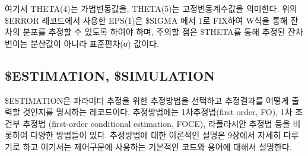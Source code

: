 \documentclass[
  10pt,
  krantz2,
  a4paper]{krantz}
\newenvironment{Shaded}{\begin{snugshade}}{\end{snugshade}}
\newcommand{\DecValTok}[1]{\textcolor[rgb]{0.00,0.00,0.81}{#1}}
\newcommand{\FloatTok}[1]{\textcolor[rgb]{0.00,0.00,0.81}{#1}}
\newcommand{\KeywordTok}[1]{\textcolor[rgb]{0.13,0.29,0.53}{\textbf{#1}}}
\newcommand{\NormalTok}[1]{#1}
\newcommand{\OperatorTok}[1]{\textcolor[rgb]{0.81,0.36,0.00}{\textbf{#1}}}
\newcommand{\StringTok}[1]{\textcolor[rgb]{0.31,0.60,0.02}{#1}}
\theoremstyle{definition}
\theoremstyle{definition}
\theoremstyle{definition}
\theoremstyle{remark}
\begin{document}
\begin{Shaded}
\end{Shaded}

여기서 THETA(4)는 가법변동값을, THETA(5)는 고정변동계수값을 의미한다. 위의 \$ERROR 레코드에서 사용한 EPS(1)은 \$SIGMA 에서 1로 FIX하여 W식을 통해 잔차의 분포를 추정할 수 있도록 하여야 하며, 주의할 점은 \$THETA를 통해 추정된 잔차변이는 분산값이 아니라 표준편차(σ) 값이다.

\hypertarget{estimation-simulation}{%
\subsection{\$ESTIMATION, \$SIMULATION}\label{estimation-simulation}}

\$ESTIMATION은 파라미터 추정을 위한 추정방법을 선택하고 추정결과를 어떻게 출력할 것인지를 명시하는 레코드이다.
추정방법에는 1차추정법(first order, FO), 1차 조건부 추정법 (first-order
conditional estimation, FOCE), 라플라시안 추정법 등을 비롯하여 다양한 방법들이 있다. 추정방법에 대한
이론적인 설명은 9장에서 자세히 다루기로 하고 여기서는 제어구문에 사용하는 기본적인 코드와 용어에 대해서 설명한다.

\begin{Shaded}
\end{Shaded}
\end{document}
